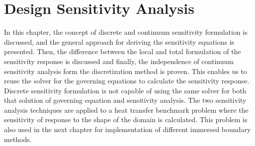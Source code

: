 \chapter{Design Sensitivity Analysis}\label{ch:sensitivityAnalysis}
In this chapter, the concept of discrete and continuum sensitivity formulation is discussed, and the general approach for deriving the sensitivity equations is presented. Then, the difference between the local and total formulation of the sensitivity response is discussed and finally, the independence of continuum sensitivity analysis form the discretization method is proven. This enables us to reuse the solver for the governing equations to calculate the sensitivity response. Discrete sensitivity formulation is not capable of using the same solver for both that solution of governing equation and sensitivity analysis. The two sensitivity analysis techniques are applied to a heat transfer benchmark problem where the sensitivity of response to the shape of the domain is calculated. This problem is also used in the next chapter for implementation of different immersed boundary methods.

